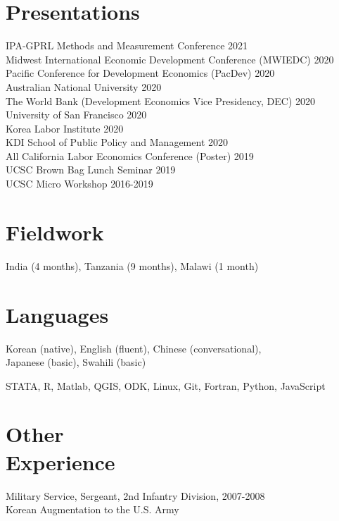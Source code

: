 \documentclass[letterpaper, margin, 10pt]{res} %
\newcommand{\blank}[1]{\hspace*{#1}\linebreak[0]}
\begin{document}
\begin{resume}
\section{Presentations}
IPA-GPRL Methods and Measurement Conference  \hfill{2021}\\
Midwest International Economic Development Conference (MWIEDC)  \hfill{2020}\\
Pacific Conference for Development Economics (PacDev) \hfill{2020}\\
Australian National University \hfill{2020}\\
The World Bank (Development Economics Vice Presidency, DEC) \hfill{2020}\\
University of San Francisco \hfill{2020}\\
Korea Labor Institute \hfill{2020}\\
KDI School of Public Policy and Management \hfill{2020}\\
All California Labor Economics Conference (Poster)   \hfill{2019}\\
UCSC Brown Bag Lunch Seminar  \hfill{2019}\\
UCSC Micro Workshop \hfill{2016-2019}


\section{Fieldwork}
India (4 months), Tanzania (9 months), Malawi (1 month)

\section{\sc \textbf{Languages}}
Korean (native), English (fluent), Chinese (conversational), \\ Japanese (basic), Swahili (basic)

STATA, R, Matlab, QGIS, ODK, Linux, Git, Fortran, Python, JavaScript

\section{\sc \textbf{Other \\ Experience}}
Military Service, Sergeant, 2nd Infantry Division, \hfill{2007-2008} \\
\blank{0.5cm} Korean Augmentation to the U.S. Army


\end{resume}
\end{document}
